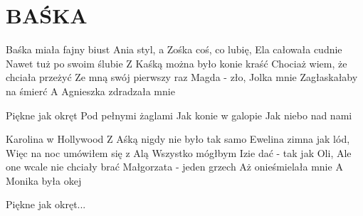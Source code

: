 \documentclass[../../../songbook.tex]{subfiles}
\begin{document}
\TabPositions{8cm} %
\section*{BAŚKA}
{}
\vspace{0.5cm}
Baśka miała fajny biust				 \newline
Ania styl, a Zośka coś, co lubię,	 \newline
Ela całowała cudnie  			\newline
Nawet tuż po swoim ślubie 			\newline
Z Kaśką można było konie kraść 			\newline
Chociaż wiem, że chciała przeżyć 			\newline
Ze mną swój pierwszy raz 			\newline
Magda - zło, Jolka mnie 			\newline
Zagłaskałaby na śmierć 			\newline
A Agnieszka zdradzała mnie 			\newline

\-\hspace{1cm} Piękne jak okręt			 \newline
\-\hspace{1cm} Pod pełnymi żaglami		 \newline
\-\hspace{1cm} Jak konie w galopie 			\newline
\-\hspace{1cm} Jak niebo nad nami 			\newline

Karolina w Hollywood 			\newline
Z Aśką nigdy nie było tak samo 			\newline
Ewelina zimna jak lód, 			\newline
Więc na noc umówiłem się z Alą 			\newline
Wszystko mógłbym Izie dać  			\newline
- tak jak Oli, 			\newline
Ale one wcale nie chciały brać 			\newline
Małgorzata - jeden grzech 			\newline
Aż onieśmielała mnie 			\newline
A Monika była okej 			\newline

\-\hspace{1cm} Piękne jak okręt... 			\newline
\end{document}
